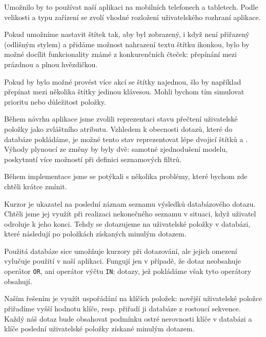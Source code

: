 Umožnilo by to používat naší aplikaci na mobilních telefonech a tabletech.
Podle velikosti a typu zařízení se zvolí vhodné rozložení uživatelského rozhraní aplikace.
 
Pokud umožníme nastavit štítek tak, aby byl zobrazený, i když není přiřazený (odlišným stylem) a přidáme možnost nahrazení textu štítku ikonkou, bylo by možné docílit funkcionality známé z konkurenčních čteček: přepínání mezi prázdnou a plnou hvězdičkou.

Pokud by bylo možné provést více akcí se štítky najednou, šlo by například přepínat mezi několika štítky jedinou klávesou.
Mohli bychom tím simulovat prioritu nebo důležitost položky.

Během návrhu aplikace jsme zvolili reprezentaci stavu přečtení uživatelské položky jako zvláštního atributu.
Vzhledem k obecnosti dotazů, které do databáze pokládáme, je možné tento stav reprezentovat lépe dvojicí štítků  a .
Výhody plynoucí ze změny by byly dvě: samotné zjednodušení modelu, poskytnutí více možností při definici seznamových filtrů.


Během implementace jsme se potýkali s několika problémy, které bychom zde chtěli krátce zmínit.


Kurzor je ukazatel na poslední záznam seznamu výsledků databázového dotazu.
Chtěli jsme jej využít při realizaci nekonečného seznamu v situaci, když uživatel odroluje k jeho konci.
Tehdy se dotazujeme na uživatelské položky v databázi, které následují po položkách získaných minulým dotazem.

Použitá databáze sice umožňuje kurzory při dotazování, ale jejich omezení vylučuje použití v naší aplikaci.
Fungují jen v případě, že dotaz neobsahuje operátor \verb|OR|, ani operátor výčtu \verb|IN|; dotazy, jež pokládáme však tyto operátory obsahují. 

Naším řešením je využít uspořádání na klíčích položek: novější uživatelské položce přiřadíme vyšší hodnotu klíče, resp. přiřadí ji databáze z rostoucí sekvence.
Každý náš dotaz bude obsahovat podmínku ostré nerovnosti klíče v databázi a klíče poslední uživatelské položky získané minulým dotazem.



